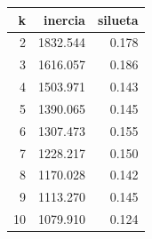 \begin{tabular}{rrr}
\toprule
k & inercia & silueta \\
\midrule
2 & 1832.544 & 0.178 \\
3 & 1616.057 & 0.186 \\
4 & 1503.971 & 0.143 \\
5 & 1390.065 & 0.145 \\
6 & 1307.473 & 0.155 \\
7 & 1228.217 & 0.150 \\
8 & 1170.028 & 0.142 \\
9 & 1113.270 & 0.145 \\
10 & 1079.910 & 0.124 \\
\bottomrule
\end{tabular}
